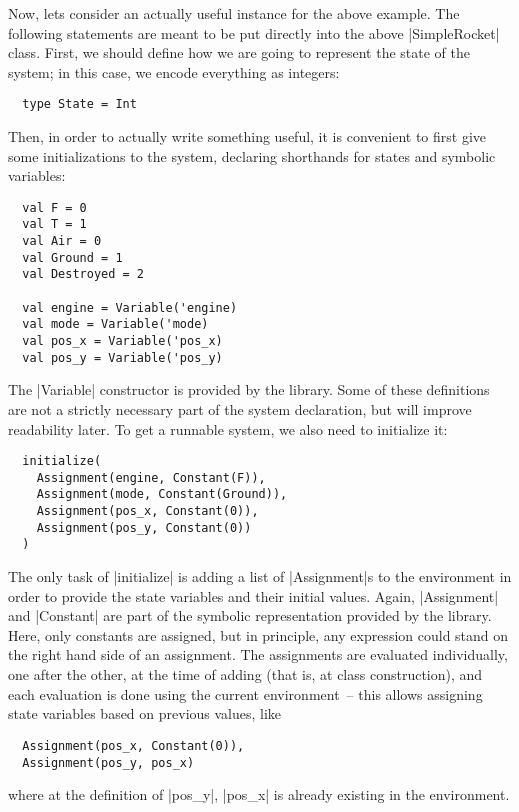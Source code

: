Now, lets consider an actually useful instance for the above example. The following statements are
meant to be put directly into the above |SimpleRocket| class. First, we should define how we are
going to represent the state of the system; in this case, we encode everything as integers:
\begin{lstlisting}
  type State = Int
\end{lstlisting}
Then, in order to actually write something useful, it is convenient to first give some
initializations to the system, declaring shorthands for states and symbolic variables:
\begin{lstlisting}
  val F = 0
  val T = 1
  val Air = 0
  val Ground = 1
  val Destroyed = 2

  val engine = Variable('engine)
  val mode = Variable('mode)
  val pos_x = Variable('pos_x)
  val pos_y = Variable('pos_y)
\end{lstlisting}
The |Variable| constructor is provided by the library. Some of these definitions are not a strictly
necessary part of the system declaration, but will improve readability later. To get a runnable
system, we also need to initialize it:
\begin{lstlisting}
  initialize(
    Assignment(engine, Constant(F)),
    Assignment(mode, Constant(Ground)),
    Assignment(pos_x, Constant(0)),
    Assignment(pos_y, Constant(0))
  )
\end{lstlisting}
The only task of |initialize| is adding a list of |Assignment|s to the environment in order to
provide the state variables and their initial values. Again, |Assignment| and |Constant| are part of
the symbolic representation provided by the library. Here, only constants are assigned, but in
principle, any expression could stand on the right hand side of an assignment. The assignments are
evaluated individually, one after the other, at the time of adding (that is, at class construction),
and each evaluation is done using the current environment~-- this allows assigning state variables
based on previous values, like
\begin{lstlisting}
  Assignment(pos_x, Constant(0)),
  Assignment(pos_y, pos_x)
\end{lstlisting}
where at the definition of |pos_y|, |pos_x| is already existing in the environment.

